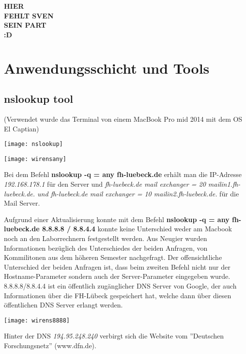 \documentclass{scrartcl}
\begin{document}
  \textbf{HIER\\
  FEHLT SVEN \\
  SEIN PART\\
  :D}

  \newpage
\section[Versuch 3 Anwendungsschicht und Tools]{Anwendungsschicht und Tools}

  \subsection[Aufgabe 4 nslookup tool]{nslookup tool}
  
  (Verwendet wurde das Terminal von einem MacBook Pro mid 2014 mit dem OS El Captian)
 

    \texttt{[image: nslookup]}
    \label{fig:nslookup}

    \texttt{[image: wirensany]}
    \label{fig:wirensany}
 
  

  Bei dem Befehl \textbf{nslookup -q = any fh-luebeck.de} erhält man die IP-Adresse \textit{192.168.178.1} für den Server und \textit{fh-luebeck.de mail exchanger = 20 mailin1.fh-luebeck.de. und fh-luebeck.de mail exchanger = 10 mailin2.fh-luebeck.de.} für die Mail Server. 
  
  Aufgrund einer Aktualisierung konnte mit dem Befehl \textbf{nslookup -q = any fh-luebeck.de 8.8.8.8 / 8.8.4.4} konnte keine Unterschied weder am Macbook noch an den Laborrechnern festgestellt werden. Aus Neugier wurden Informationen bezüglich des Unterschiedes der beiden Anfragen, von Kommilitonen aus dem höheren Semester nachgefragt. Der offensichtliche Unterschied der beiden Anfragen ist, dass beim zweiten Befehl nicht nur der Hostname-Parameter sondern auch der Server-Parameter eingegeben wurde. 8.8.8.8/8.8.4.4 ist ein öffentlich zugänglicher DNS Server von Google, der auch Informationen über die FH-Lübeck gespeichert hat, welche dann über diesen öffentlichen DNS Server erlangt werden.
  
    \texttt{[image: wirens8888]}
    \label{fig:wirens8888}
  
  Hinter der DNS \textit{194.95.248.240} verbirgt sich die Website vom ''Deutschen Forschungsnetz'' (www.dfn.de).
\end{document}
